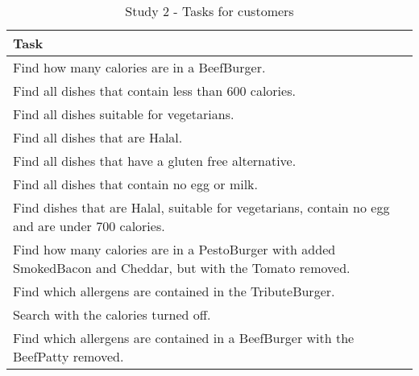 \begin{table}[h]
    \centering
    \begin{tabular}{ |p{\textwidth}| }
    \hline
    \textbf{Task}\\
    \hline
    Find how many calories are in a BeefBurger. \\
    \hline
    Find all dishes that contain less than 600 calories. \\
    \hline
    Find all dishes suitable for vegetarians. \\
    \hline
    Find all dishes that are Halal. \\
    \hline
    Find all dishes that have a gluten free alternative. \\
    \hline
    Find all dishes that contain no egg or milk. \\
    \hline
    Find dishes that are Halal, suitable for vegetarians, contain no egg and are under 700 calories. \\
    \hline
    Find how many calories are in a PestoBurger with added SmokedBacon and Cheddar, but with the Tomato removed. \\
    \hline
    Find which allergens are contained in the TributeBurger. \\
    \hline
    Search with the calories turned off. \\
    \hline
    Find which allergens are contained in a BeefBurger with the BeefPatty removed. \\
    \hline
    \end{tabular}
    \caption{Study 2 - Tasks for customers}
    \label{tab:Study2TasksC}
\end{table}


